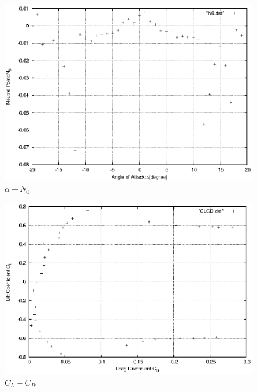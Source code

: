 \documentclass[a4j,twoside,openright,11pt]{jarticle}
\begin{document}
\begin{figure}[htbp]
\begin{center}
\includegraphics[width=12cm]{./N0/N0.eps}
\end{center}
\caption{$\alpha - N_0$}
\end{figure}

\begin{figure}[htbp]
\begin{center}
\includegraphics[width=12cm]{./CLCD/CLCD.eps}
\end{center}
\caption{$C_L - C_D$}
\end{figure}


\newpage
\end{document}
